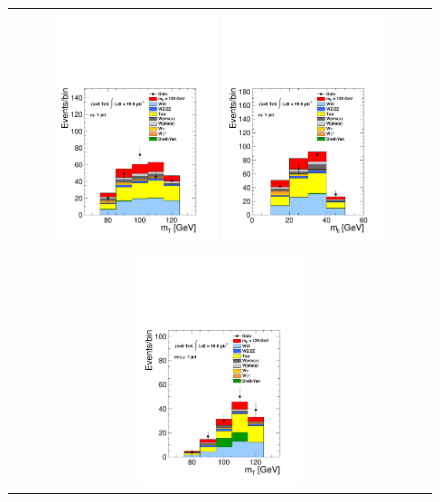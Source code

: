 %
\begin{figure}[htp] 
\centering 
\begin{tabular}{c} 
\includegraphics[width=0.4\textwidth]{figures/hww_analysis17_125_ALL_of_1j_mt.pdf}
\includegraphics[width=0.4\textwidth]{figures/hww_analysis17_125_ALL_of_1j_mll.pdf} 
\\
\includegraphics[width=0.4\textwidth]{figures/hww_analysis17_125_ALL_sf_1j_mt.pdf}

\end{tabular}
\end{figure}
